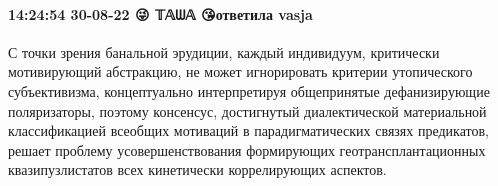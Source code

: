  
 
 
 
 

\paragraph{14:24:54 30-08-22 😜 𝕋𝔸ᗯ𝔸 😘ответила vasja}

С точки зрения банальной эрудиции, каждый индивидуум, критически мотивирующий
абстракцию, не может игнорировать критерии утопического субъективизма,
концептуально интерпретируя общепринятые дефанизирующие поляризаторы, поэтому
консенсус, достигнутый диалектической материальной классификацией всеобщих
мотиваций в парадигматических связях предикатов, решает проблему
усовершенствования формирующих геотрансплантационных квазипузлистатов всех
кинетически коррелирующих аспектов.
